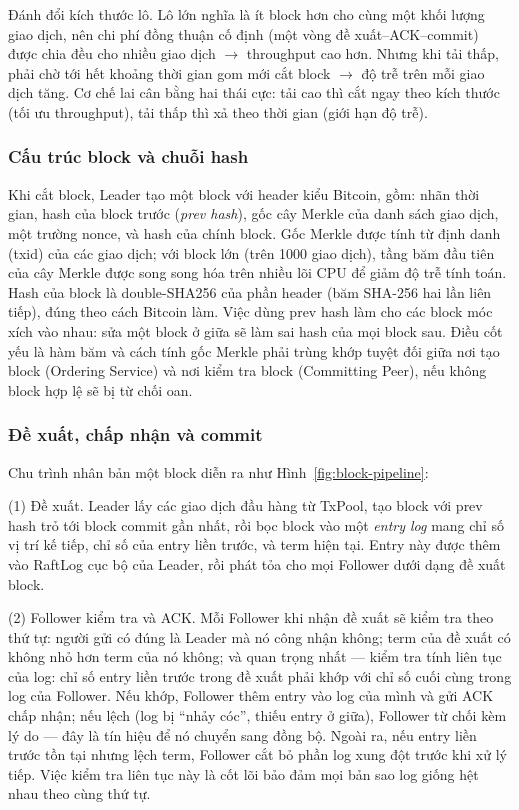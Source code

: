 Đánh đổi kích thước lô. Lô lớn nghĩa là ít block hơn cho cùng một khối
lượng giao dịch, nên chi phí đồng thuận cố định (một vòng đề xuất--ACK--commit)
được chia đều cho nhiều giao dịch $\rightarrow$ throughput cao hơn. Nhưng khi tải
thấp, phải chờ tới hết khoảng thời gian gom mới cắt block $\rightarrow$ độ trễ trên
mỗi giao dịch tăng. Cơ chế lai cân bằng hai thái cực: tải cao thì cắt ngay theo
kích thước (tối ưu throughput), tải thấp thì xả theo thời gian (giới hạn độ trễ).

\subsubsection{Cấu trúc block và chuỗi hash}

Khi cắt block, Leader tạo một block với header kiểu Bitcoin, gồm: nhãn thời gian,
hash của block trước (\textit{prev hash}), gốc cây Merkle của danh sách giao dịch,
một trường nonce, và hash của chính block. Gốc Merkle được tính từ định danh
(txid) của các giao dịch; với block lớn (trên 1000 giao dịch), tầng băm đầu tiên
của cây Merkle được song song hóa trên nhiều lõi CPU để giảm độ trễ tính
toán. Hash của block là double-SHA256 của phần header (băm SHA-256 hai
lần liên tiếp), đúng theo cách Bitcoin làm. Việc dùng prev hash làm cho các block
móc xích vào nhau: sửa một block ở giữa sẽ làm sai hash của mọi block sau. Điều
cốt yếu là hàm băm và cách tính gốc Merkle phải trùng khớp tuyệt đối giữa
nơi tạo block (Ordering Service) và nơi kiểm tra block (Committing Peer), nếu không
block hợp lệ sẽ bị từ chối oan.

\subsubsection{Đề xuất, chấp nhận và commit}

Chu trình nhân bản một block diễn ra như Hình~\ref{fig:block-pipeline}:

(1) Đề xuất. Leader lấy các giao dịch đầu hàng từ TxPool, tạo block với
prev hash trỏ tới block commit gần nhất, rồi bọc block vào một \textit{entry log}
mang chỉ số vị trí kế tiếp, chỉ số của entry liền trước, và term hiện tại. Entry
này được thêm vào RaftLog cục bộ của Leader, rồi phát tỏa cho mọi Follower dưới
dạng đề xuất block.

(2) Follower kiểm tra và ACK. Mỗi Follower khi nhận đề xuất sẽ kiểm tra
theo thứ tự: người gửi có đúng là Leader mà nó công nhận không; term của đề xuất
có không nhỏ hơn term của nó không; và quan trọng nhất --- kiểm tra tính
liên tục của log: chỉ số entry liền trước trong đề xuất phải khớp với chỉ số cuối
cùng trong log của Follower. Nếu khớp, Follower thêm entry vào log của mình và gửi
ACK chấp nhận; nếu lệch (log bị ``nhảy cóc'', thiếu entry ở giữa), Follower từ chối
kèm lý do --- đây là tín hiệu để nó chuyển sang đồng bộ. Ngoài ra, nếu entry liền
trước tồn tại nhưng lệch term, Follower cắt bỏ phần log xung đột trước khi xử lý
tiếp. Việc kiểm tra liên tục này là cốt lõi bảo đảm mọi bản sao log giống hệt nhau
theo cùng thứ tự.

